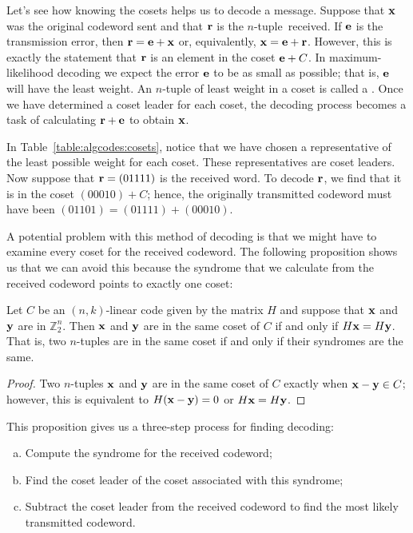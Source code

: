  
Let's see how knowing the cosets helps us to decode a
message. Suppose that ${\bold x}$ was the original codeword sent and
that ${\bold r}$ is the \mbox{$n$-tuple received}. If ${\bold e}$ is the
transmission error, then ${\bold r} = {\bold e} + {\bold x}$ or,
equivalently, ${\bold x} = {\bold e} + {\bold r}$. However, this is
exactly the statement that ${\bold r}$ is an element in the coset 
${\bold e} + C$. In maximum-likelihood decoding we expect the error
${\bold e}$ to be as small as possible; that is, ${\bold e}$ will have
the least weight. An $n$-tuple of least weight in a coset is called a
. Once we have determined a
coset leader for each coset, the decoding process becomes a task
of calculating ${\bold r} + {\bold e}$ to obtain ${\bold x}$.
 
 
\begin{example}{}
In Table~\ref{table:algcodes:cosets}, notice that we have chosen a representative of the least
possible weight for each coset.  These representatives are coset
leaders. Now suppose that ${\bold r} = (01111)$ is the received word.
To decode ${\bold r}$, we find that it is in the coset $(00010) + C$;
hence, the originally transmitted codeword must have been $(01101) =
(01111) + (00010)$. 
\end{example}
 
 
A potential problem with this method of decoding is that we might have
to examine every coset for the received codeword. The following
proposition shows us that we can avoid this because the syndrome
that we  calculate from the received codeword points to exactly one coset:

 \begin{prop}{}
Let $C$ be an $(n,k)$-linear code given by the matrix $H$ and suppose
that ${\bold x}$ and ${\bold y}$ are in $\mathbb{Z}_2^n$. Then ${\bold
x}$ and ${\bold y}$ are in the same coset of $C$ if and only if
$H{\bold x} = H{\bold y}$. That is, two $n$-tuples are in the same
coset if and only if their syndromes are the same.
\end{prop}
 
 \begin{proof}
Two $n$-tuples ${\bold x}$ and ${\bold y}$ are in the same coset of
$C$ exactly when ${\bold x} - {\bold y} \in C$; however, this is
equivalent to $H({\bold x} - {\bold y}) = 0$ or $H {\bold x} = H
{\bold y}$. 
\end{proof}

This proposition gives us a three-step process for finding decoding:
\begin{enumerate}[(a)]
\item
Compute the syndrome for the received codeword;
\item
Find the coset leader of the coset associated with this syndrome;
\item
Subtract the coset leader from the received codeword to find the most likely transmitted codeword.
\end{enumerate}

